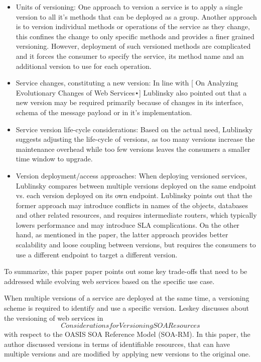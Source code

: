 \documentclass[runningheads,a4paper]{llncs}
\begin{document}
\begin{itemize}

  \item Units of versioning: One approach to version a service is to apply a single version to all it’s methods that can be deployed as a group. Another approach is to version individual methods or operations of the service as they change, this confines the change to only specific methods and provides a finer grained versioning. However, deployment of such versioned methods are complicated and it forces the consumer to specify the service, its method name and an additional version to use for each operation.
  \item Service changes, constituting a new version: In line with [ On Analyzing Evolutionary Changes of Web Services⋆]  Lublinsky also pointed out that a new version may be required primarily because of changes in its interface, schema of the message payload or in it’s implementation.
  \item Service version life-cycle considerations: Based on the actual need, Lublinsky suggests adjusting the life-cycle of versions, as too many versions increase the maintenance overhead while too few versions leaves the consumers a smaller time window to upgrade.
  \item Version deployment/access approaches: When deploying versioned services, Lublinsky compares between multiple versions deployed on the same endpoint vs. each version deployed on its own endpoint. Lublinsky points out that the former approach may introduce conflicts in names of the objects, databases and other related resources, and requires intermediate routers, which typically lowers performance and may introduce SLA complications. On the other hand, as mentioned in the paper, the latter approach provides better scalability and loose coupling between versions, but requires the consumers to use a different endpoint to target a different version.

\end{itemize}

To summarize, this paper paper points out some key trade-offs that need to be addressed while evolving web services based on the specific use case.

When multiple versions of a service are deployed at the same time, a versioning scheme is required to identify and use a specific version. Leskey discusses about the versioning of web services in \[Considerations for Versioning SOA Resources\] with respect to the OASIS SOA Reference Model (SOA-RM). In this paper, the author discussed versions in terms of identifiable resources, that can have multiple versions and are modified by applying new versions to the original one.
\end{document}
